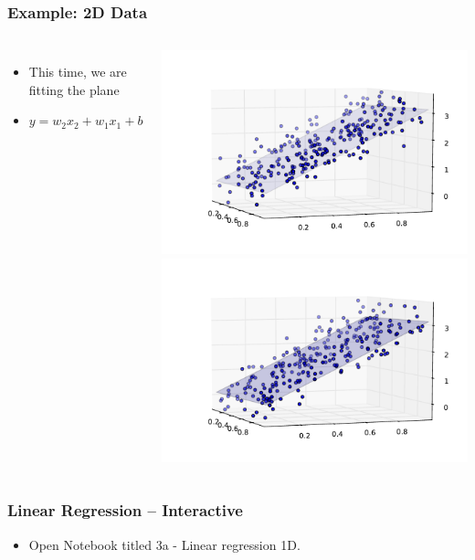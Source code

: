 \begin{frame}
    \frametitle{Example: 2D Data}
    \begin{columns}
            \begin{itemize}
                \item This time, we are fitting the plane
                \item $y =  w_2 x_2 + w_1 x_1 + b$

            \end{itemize}
            \includegraphics[width=1\linewidth]{linreg-pics/with_plane}\\
            \includegraphics[width=1\linewidth]{linreg-pics/lin_reg_plane}\\

    \end{columns}
\end{frame}


\begin{frame}
    \frametitle{Linear Regression -- Interactive}
    \begin{itemize}
        \item Open Notebook titled 3a - Linear regression 1D.
    \end{itemize}
\end{frame}

